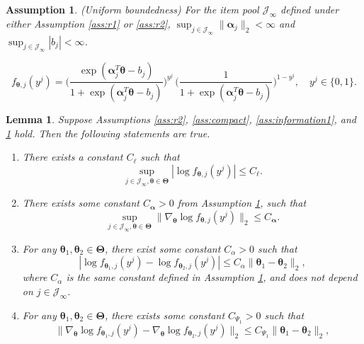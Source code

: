 \documentclass[10pt,a4paper]{amsart}
\newtheorem{assumption}{Assumption}
\newtheorem{lemma}{Lemma}
\newcommand{\bfTheta}{\boldsymbol{\Theta}}
\newcommand{\bfalpha}{\boldsymbol{\alpha}}
\newcommand{\bftheta}{\boldsymbol{\theta}}
\begin{document}
\begin{assumption} \label{ass:information3} (Uniform boundedness) For the item pool $\mathcal{J}_{\infty}$ defined under either Assumption \ref{ass:r1} or \ref{ass:r2}, $\sup_{j \in \mathcal{J}_{\infty}} \| \bfalpha_j \|_2 < \infty$ and $\sup_{j \in \mathcal{J}_{\infty}} |b_j| < \infty$. 
\end{assumption}

\begin{equation} \label{e:density}
f_{\bftheta, j}(y^j) = \Big( \frac{\exp( \bfalpha_j^T \bftheta - b_j)}{1 + \exp( \bfalpha_j^T \bftheta - b_j)} \Big)^{y^j} \, \Big( \frac{1}{1 + \exp( \bfalpha_j^T \bftheta - b_j)} \Big)^{1 - y^j}, \quad y^j \in \{0,1\}.
\end{equation} 

\begin{lemma} \label{lemma:lemma3}
Suppose Assumptions \ref{ass:r2}, \ref{ass:compact}, \ref{ass:information1}, and \ref{ass:information3} hold. Then the following statements are true.
\begin{enumerate}
\item{There exists a constant $C_{\ell}$ such that 
\begin{equation*}
\sup_{j \in \mathcal{J}_{\infty}, \bftheta \in \bfTheta} | \log f_{\bftheta, j}(y^j) | \leq C_{\ell}.
\end{equation*}}
\item{There exists some constant $C_{\bfalpha} > 0$ from Assumption \ref{ass:information3}, such that
\begin{equation*}
\sup_{j \in \mathcal{J}_{\infty}, \bftheta \in \bfTheta} \| \nabla_{\bftheta} \log f_{\bftheta, j}(y^j) \|_2 \leq C_{\bfalpha}.
\end{equation*}
}
\item{For any $\bftheta_1, \bftheta_2 \in \bfTheta$, there exist some constant $C_{\alpha} > 0$ such that 
\begin{equation*}
| \log f_{\bftheta_1, j}(y^j) - \log f_{\bftheta_2, j}(y^j) | \leq C_{\alpha} \| \bftheta_1 - \bftheta_2 \|_2,
\end{equation*}
where $C_{\alpha}$ is the same constant defined in Assumption \ref{ass:information3}, and does not depend on $j \in \mathcal{J}_{\infty}$.}
\item{For any $\bftheta_1, \bftheta_2 \in \bfTheta$, there exists some constant $C_{\Psi_1} > 0$ such that 
\begin{equation*}
\| \nabla_{\bftheta} \log f_{\bftheta_1, j}(y^j) - \nabla_{\bftheta} \log f_{\bftheta_2, j}(y^j) \|_{2} \leq C_{\Psi_1} \| \bftheta_1 - \bftheta_2 \|_2,

\end{equation*}}
\end{enumerate}
\end{lemma}
\end{document}
